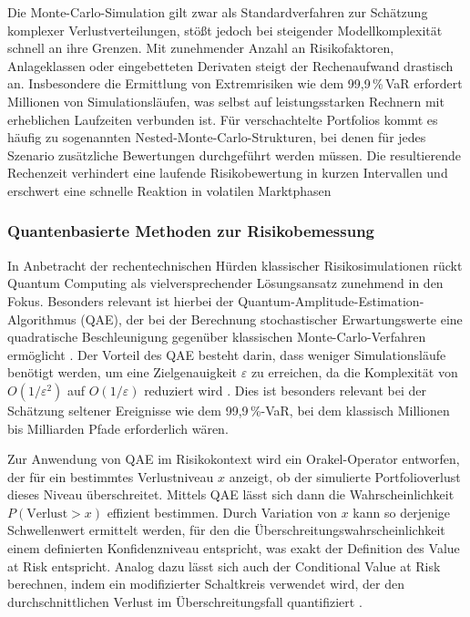 Die Monte-Carlo-Simulation gilt zwar als Standardverfahren zur Schätzung komplexer Verlustverteilungen, stößt jedoch bei steigender Modellkomplexität schnell an ihre Grenzen. Mit zunehmender Anzahl an Risikofaktoren, Anlageklassen oder eingebetteten Derivaten steigt der Rechenaufwand drastisch an. Insbesondere die Ermittlung von Extremrisiken wie dem 99{,}9\,\%\,VaR erfordert Millionen von Simulationsläufen, was selbst auf leistungsstarken Rechnern mit erheblichen Laufzeiten verbunden ist. Für verschachtelte Portfolios kommt es häufig zu sogenannten Nested-Monte-Carlo-Strukturen, bei denen für jedes Szenario zusätzliche Bewertungen durchgeführt werden müssen. Die resultierende Rechenzeit verhindert eine laufende Risikobewertung in kurzen Intervallen und erschwert eine schnelle Reaktion in volatilen Marktphasen \cite{bouland_prospects_2020, orus_quantum_2019}


\subsubsection*{Quantenbasierte Methoden zur Risikobemessung}

In Anbetracht der rechentechnischen Hürden klassischer Risikosimulationen rückt Quantum Computing als vielversprechender Lösungsansatz zunehmend in den Fokus. Besonders relevant ist hierbei der Quantum-Amplitude-Estimation-Algorithmus (QAE), der bei der Berechnung stochastischer Erwartungswerte eine quadratische Beschleunigung gegenüber klassischen Monte-Carlo-Verfahren ermöglicht \cite{quantumjournal2020, rebentrost_quantum_2018}. Der Vorteil des QAE besteht darin, dass weniger Simulationsläufe benötigt werden, um eine Zielgenauigkeit $\varepsilon$ zu erreichen, da die Komplexität von $O(1/\varepsilon^2)$ auf $O(1/\varepsilon)$ reduziert wird \cite{martin2022}. Dies ist besonders relevant bei der Schätzung seltener Ereignisse wie dem 99{,}9\,\%-VaR, bei dem klassisch Millionen bis Milliarden Pfade erforderlich wären.

Zur Anwendung von QAE im Risikokontext wird ein Orakel-Operator entworfen, der für ein bestimmtes Verlustniveau $x$ anzeigt, ob der simulierte Portfolioverlust dieses Niveau überschreitet. Mittels QAE lässt sich dann die Wahrscheinlichkeit $P(\text{Verlust} > x)$ effizient bestimmen. Durch Variation von $x$ kann so derjenige Schwellenwert ermittelt werden, für den die Überschreitungswahrscheinlichkeit einem definierten Konfidenzniveau entspricht, was exakt der Definition des Value at Risk entspricht. Analog dazu lässt sich auch der Conditional Value at Risk berechnen, indem ein modifizierter Schaltkreis verwendet wird, der den durchschnittlichen Verlust im Überschreitungsfall quantifiziert \cite{orus_quantum_2019, egger_quantum_2020}.

